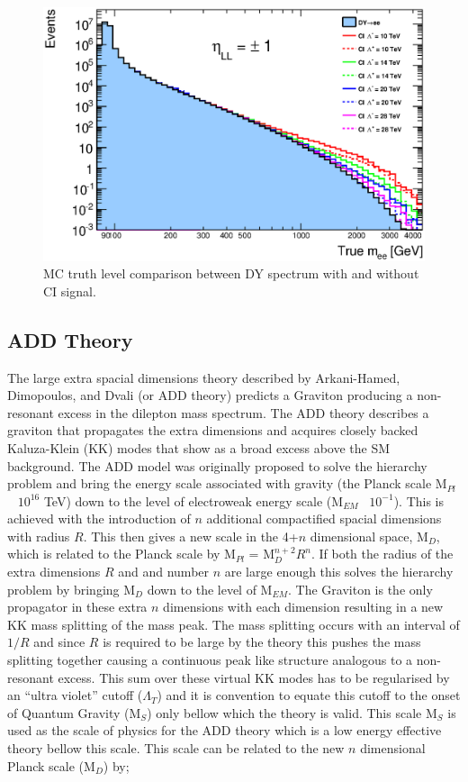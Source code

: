         \begin{figure}[h]
            \begin{center}
            \includegraphics[width=0.8\linewidth]{images/truth_mass_LL.eps}
            \end{center}
            \caption{MC truth level comparison between DY spectrum with and without CI signal.}
            \label{fig:theoryInvMass}
        \end{figure}

    

    \subsection{ADD Theory}
        The large extra spacial dimensions theory described by Arkani-Hamed, Dimopoulos, and Dvali (or ADD theory) \cite{ArkaniHamed:1998rs} predicts a Graviton producing a non-resonant excess in the dilepton mass spectrum. The ADD theory describes a graviton that propagates the extra dimensions and acquires closely backed Kaluza-Klein (KK) modes that show as a broad excess above the SM background. 
        The ADD model was originally proposed to solve the hierarchy problem and bring the energy scale associated with gravity (the Planck scale M$_{Pl}$ ~ $10^{16}$ TeV) down to the level of electroweak energy scale (M$_{EM}$~ $10^{-1}$). This is achieved with the introduction of $n$ additional compactified spacial dimensions with radius $R$. This then gives a new scale in the 4+$n$ dimensional space, M$_{D}$, which is related to the Planck scale by M$_{Pl}$ = M$_{D}^{n+2}R^{n}$. If both the radius of the extra dimensions $R$ and and number $n$ are large enough this solves the hierarchy problem by bringing M$_{D}$ down to the level of M$_{EM}$.
        The Graviton is the only propagator in these extra $n$ dimensions with each dimension resulting in a new KK mass splitting of the mass peak. The mass splitting occurs with an interval of $1/R$ and since $R$ is required to be large by the theory this pushes the mass splitting together causing a continuous peak like structure analogous to a non-resonant excess. This sum over these virtual KK modes has to be regularised by an ``ultra violet'' cutoff ($\Lambda_{T}$) and it is convention to equate this cutoff to the onset of Quantum Gravity (M$_{S}$) only bellow which the theory is valid. This scale M$_{S}$ is used as the scale of physics for the ADD theory which is a low energy effective theory bellow this scale. This scale can be related to the new $n$ dimensional Planck scale (M$_{D}$) by;

